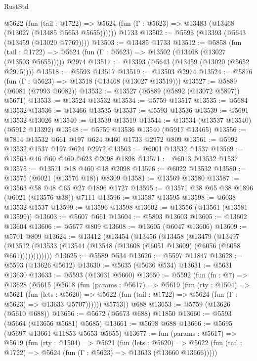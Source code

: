 \begin{lexlean}{RustStd}
\begin{coremodule}
    @5622
      (fun (tail : @1722) =>
      @5624 (fun (Γ : @5623) => @13483 (@13468 (@13027 (@13485 @5653 @5655))))))
    @1733
@13502 := @5593 (@13393 (@5643 (@13459 (@13020 @7769))))
@13503 := @13485 @1733
@13512 := @5858
    (fun (tail : @1722) => @5624 (fun (Γ : @5623) => @13502 (@13468 (@13027 (@13503 @5655)))))
    @2974
@13517 := @13393 (@5643 (@13459 (@13020 (@5652 @2975))))
@13518 := @5593 @13517
@13519 := @13503 @2974
@13524 := @5876 (fun (Γ : @5623) => @13518 (@13468 (@13027 @13519)))
@13527 := @5889 (@6081 (@7993 @6082))
@13532 := @13527 (@5889 (@5892 (@13072 @5897)) @5671)
@13533 := @13524 @13532
@13534 := @5759 @13517
@13535 := @5684 @13532
@13536 := @13466 @13535
@13537 := @5593 @13536
@13539 := @5691 @13532 @13026
@13540 := @13539 @13519
@13544 := @13534 (@13537 @13540) (@5912 @13392)
@13548 := @5759 @13536 @13540 (@5917 @13465)
@13556 := @7814 @13532 @661 @197 @624 @460 @1733 @2972 @809
@13561 := @5992 @13532 @1537 @197 @624 @2972
@13563 := @6001 @13532 @1537
@13569 := @13563 @46 @60 @460 @623 @2098 @1898
@13571 := @6013 @13532 @1537
@13575 := @13571 @18 @460 @18 @2098
@13576 := @6022 @13532
@13580 := @13575 (@6021 (@13576 @18)) @8309
@13581 := @13569 @13580
@13587 := @13563 @58 @48 @65 @27 @1896 @1727
@13595 := @13571 @38 @65 @38 @1896 (@6021 (@13576 @38)) @7111
@13596 := @13587 @13595
@13598 := @6038 @13532 @1537
@13599 := @13596 @13598
@13602 := @13556 (@13561 (@13581 @13599))
@13603 := @5607 @661
@13604 := @5803 @13603
@13605 := @13602 @13604
@13606 := @5677 @809
@13608 := @13605 (@6047 @13606)
@13609 := @5701 @809
@13624 := @13412
    (@13454
      (@13456
        (@13458
          (@13479
            (@13497
              (@13512 (@13533 (@13544 (@13548 (@13608 (@6051 @13609) (@6056 (@6058 @661))))))))))))
@13625 := @5589 @534
@13626 := @5597 @11847
@13628 := @5593 (@13626 @5612)
@13630 := @5635 (@5636 @534)
@13631 := @5631 @13630
@13633 := @5593 (@13631 @5660)
@13650 := @5592
    (fun (fn : @7) =>
    @13628
      (@5615
        (@5618
          (fun (params : @5617) =>
          @5619
            (fun (rty : @1504) =>
            @5621
              (fun (lets : @5620) =>
              @5622 (fun (tail : @1722) => @5624 (fun (Γ : @5623) => @13633 @5707))))))
        @5753))
    @688
@13653 := @5759 (@13626 (@5610 @688))
@13656 := @5672 (@5673 @688) @11850
@13660 := @5593 (@5664 (@13656 @5681) @5685)
@13661 := @5698 @688
@13666 := @5695 (@5697 @13661 @11853 @5653 @5655)
@13677 := fun (params : @5617) =>
  @5619
    (fun (rty : @1504) =>
    @5621
      (fun (lets : @5620) =>
      @5622 (fun (tail : @1722) => @5624 (fun (Γ : @5623) => @13633 (@13660 @13666)))))

\end{coremodule}
\end{lexlean}
